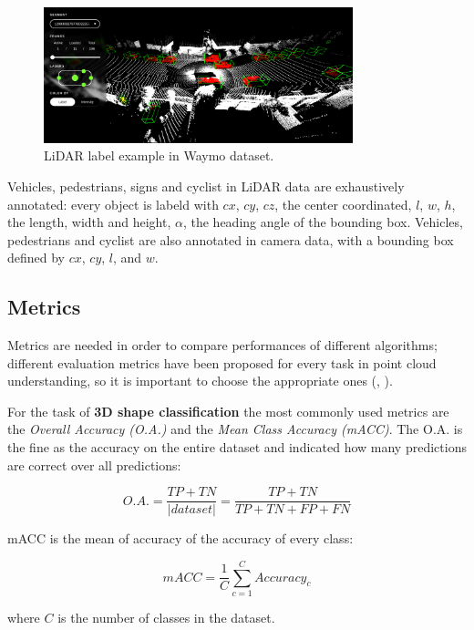 \begin{figure}[ht]
    \centering
    \includegraphics[width=0.8\textwidth]{images/waymo.png}
    \caption{LiDAR label example in Waymo dataset.}
    \label{fig:waymo}
\end{figure}

Vehicles, pedestrians, signs and cyclist in LiDAR data are exhaustively annotated: every object is labeld with $cx$, $cy$, $cz$, the center coordinated, $l$, $w$, $h$, the length, width and height, $\alpha$, the heading angle of the bounding box. Vehicles, pedestrians and cyclist are also annotated in camera data, with a bounding box defined by $cx$, $cy$, $l$, and $w$.

\subsection{Metrics}
\label{subsec:metrics}

Metrics are needed in order to compare performances of different algorithms; different evaluation metrics have been proposed for every task in point cloud understanding, so it is important to choose the appropriate ones (\cite{lu2020deep}, \cite{guo2020deep}).

For the task of \textbf{3D shape classification} the most commonly used metrics are the \textit{Overall Accuracy (O.A.)} and the \textit{Mean Class Accuracy (mACC)}. The O.A. is the fine as the accuracy on the entire dataset and indicated how many predictions are correct over all predictions:

\[O.A. = \frac{TP+TN}{|dataset|}=\frac{TP+TN}{TP+TN+FP+FN}\]

mACC is the mean of accuracy of the accuracy of every class:

\[mACC = \frac{1}{C} \sum\limits_{c=1}^C Accuracy_c\]

where $C$ is the number of classes in the dataset.


